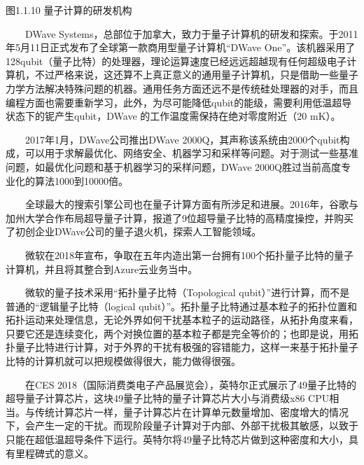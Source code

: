 \documentclass[a4paper,11pt,english]{sphinxmanual}
\begin{document}
\begin{center}图1.1.10 量子计算的研发机构
\end{center}
\sphinxAtStartPar
{}

\sphinxAtStartPar
  D\sphinxhyphen{}Wave Systems，总部位于加拿大，致力于量子计算机的研发和探索。于2011年5月11日正式发布了全球第一款商用型量子计算机“D\sphinxhyphen{}Wave One”。该机器采用了128\sphinxhyphen{}qubit（量子比特）的处理器，理论运算速度已经远远超越现有任何超级电子计算机，不过严格来说，这还算不上真正意义的通用量子计算机，只是借助一些量子力学方法解决特殊问题的机器。通用任务方面还远不是传统硅处理器的对手，而且编程方面也需要重新学习，此外，为尽可能降低qubit的能级，需要利用低温超导状态下的铌产生qubit，D\sphinxhyphen{}Wave 的工作温度需保持在绝对零度附近（20 mK）。

\sphinxAtStartPar
  2017年1月，D\sphinxhyphen{}Wave公司推出D\sphinxhyphen{}Wave 2000Q，其声称该系统由2000个qubit构成，可以用于求解最优化、网络安全、机器学习和采样等问题。对于测试一些基准问题，如最优化问题和基于机器学习的采样问题，D\sphinxhyphen{}Wave 2000Q胜过当前高度专业化的算法1000到10000倍。

\sphinxAtStartPar
{}

\sphinxAtStartPar
  全球最大的搜索引擎公司也在量子计算方面有所涉足和进展。2016年，谷歌与加州大学合作布局超导量子计算，报道了9位超导量子比特的高精度操控，并购买了初创企业D\sphinxhyphen{}Wave公司的量子退火机，探索人工智能领域。

\sphinxAtStartPar
{}

\sphinxAtStartPar
  微软在2018年宣布，争取在五年内造出第一台拥有100个拓扑量子比特的量子计算机，并且将其整合到Azure云业务当中。

\sphinxAtStartPar
  微软的量子技术采用“拓扑量子比特（Topological qubit）”进行计算，而不是普通的“逻辑量子比特（logical qubit）”。拓扑量子比特通过基本粒子的拓扑位置和拓扑运动来处理信息，无论外界如何干扰基本粒子的运动路径，从拓扑角度来看，只要它还是连续变化，两个对换位置的基本粒子都是完全等价的；也即是说，用拓扑量子比特进行计算，对于外界的干扰有极强的容错能力，这样一来基于拓扑量子比特的计算机就可以把规模做得很大，能力做得很强。

\sphinxAtStartPar
{}

\sphinxAtStartPar
  在CES 2018（国际消费类电子产品展览会），英特尔正式展示了49量子比特的超导量子计算芯片，这块49量子比特的量子计算芯片大小与消费级x86 CPU相当。与传统计算芯片一样，量子计算芯片在计算单元数量增加、密度增大的情况下，会产生一定的干扰。而现阶段量子计算对于内部、外部干扰极其敏感，以致于只能在超低温超导条件下运行。英特尔将49量子比特芯片做到这种密度和大小，具有里程碑式的意义。
\end{document}
